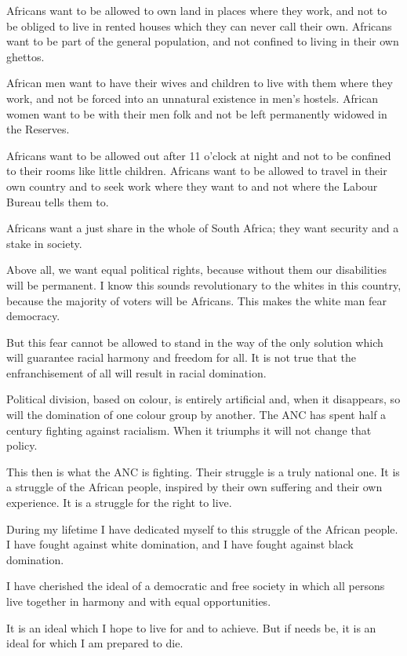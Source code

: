 \documentclass[11pt,a4paper]{article}
\begin{document}
Africans want to be allowed to own land in places where they work, and not to be obliged
to live in rented houses which they can never call their own. Africans want to be part of the
general population, and not confined to living in their own ghettos.

African men want to have their wives and children to live with them where they work, and
not be forced into an unnatural existence in men's hostels. African women want to be with
their men folk and not be left permanently widowed in the Reserves.

Africans want to be allowed out after 11 o'clock at night and not to be confined to their
rooms like little children. Africans want to be allowed to travel in their own country and to
seek work where they want to and not where the Labour Bureau tells them to.

Africans want a just share in the whole of South Africa; they want security and a stake in
society.

Above all, we want equal political rights, because without them our disabilities will be
permanent. I know this sounds revolutionary to the whites in this country, because the
majority of voters will be Africans. This makes the white man fear democracy.

But this fear cannot be allowed to stand in the way of the only solution which will
guarantee racial harmony and freedom for all. It is not true that the enfranchisement of all
will result in racial domination.

Political division, based on colour, is entirely artificial and, when it disappears, so will the
domination of one colour group by another. The ANC has spent half a century fighting
against racialism. When it triumphs it will not change that policy.

This then is what the ANC is fighting. Their struggle is a truly national one. It is a struggle
of the African people, inspired by their own suffering and their own experience. It is a
struggle for the right to live.

During my lifetime I have dedicated myself to this struggle of the African people. I have
fought against white domination, and I have fought against black domination.

I have cherished the ideal of a democratic and free society in which all persons live
together in harmony and with equal opportunities.

It is an ideal which I hope to live for and to achieve. But if needs be, it is an ideal for which
I am prepared to die.
\end{document}
